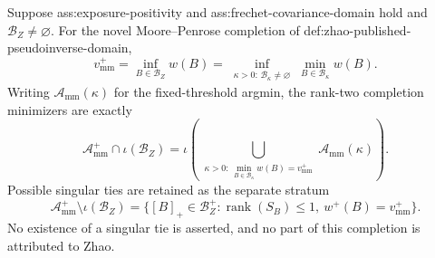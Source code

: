 Suppose ass:exposure-positivity and ass:frechet-covariance-domain hold and \(\mathcal B_Z\ne\varnothing\).  For the novel Moore--Penrose completion of def:zhao-published-pseudoinverse-domain,
\[
 v_{\mathrm{mm}}^+
 =\inf_{B\in\mathcal B_Z}w(B)
 =\inf_{\substack{\kappa>0:\,\mathcal B_\kappa\ne\varnothing}}
   \min_{B\in\mathcal B_\kappa}w(B).
\]
Writing \(\mathcal A_{\mathrm{mm}}(\kappa)\) for the fixed-threshold argmin, the rank-two completion minimizers are exactly
\[
 \mathcal A_{\mathrm{mm}}^+\cap\iota(\mathcal B_Z)
 =\iota\!\left(
 \bigcup_{\substack{\kappa>0:\,
 \min_{B\in\mathcal B_\kappa}w(B)=v_{\mathrm{mm}}^+}}
 \mathcal A_{\mathrm{mm}}(\kappa)\right).
\]
Possible singular ties are retained as the separate stratum
\[
 \mathcal A_{\mathrm{mm}}^+\setminus\iota(\mathcal B_Z)
 =\{[B]_+\in\mathcal B_Z^+:\operatorname{rank}(S_B)\le1,\ w^+(B)=v_{\mathrm{mm}}^+\}.
\]
No existence of a singular tie is asserted, and no part of this completion is attributed to Zhao.